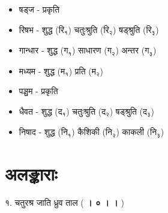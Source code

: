\documentclass[12pt]{article}
\begin{document}
\begin{sanskrit}
\begin{itemize}
 \item षड्ज - प्रकृति
 \item रिषभ - शुद्ध (रि$_{\text{१}}$) \hspace{40pt} चतुःश्रुति (रि$_{\text{२}}$) \hspace{40pt} षड्श्रुति (रि$_{\text{३}}$)
 \item गान्धार - शुद्ध (ग$_{\text{१}}$) \hspace{40pt} साधारण (ग$_{\text{२}}$) \hspace{40pt} अन्तर (ग$_{\text{३}}$)
 \item मध्यम - शुद्ध (म$_{\text{१}}$) \hspace{40pt} प्रति (म$_{\text{२}}$)
 \item पञ्चम - प्रकृति
 \item धैवत - शुद्ध (द$_{\text{१}}$) \hspace{40pt} चतुःश्रुति (द$_{\text{२}}$) \hspace{40pt} षड्श्रुति (द$_{\text{३}}$)
 \item निषाद - शुद्ध (नि$_{\text{१}}$) \hspace{40pt} कैशिकी (नि$_{\text{२}}$) \hspace{40pt} काकली (नि$_{\text{३}}$)
\end{itemize}
\newpage


\section{अलङ्काराः}


\begin{center}
 १. चतुरश्र जाति ध्रुव ताल (\textbf{ । ० । । })
\end{center}


\end{sanskrit}
\end{document}
